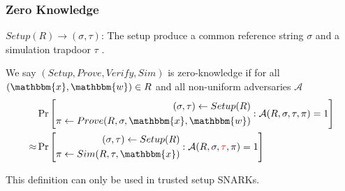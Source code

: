 \documentclass[UFT8]{beamer}
\begin{document}
\begin{frame}
    \frametitle{Zero Knowledge}
    \begin{definition}
        $Setup(R) \rightarrow (\sigma, \tau)$: The setup produce a common reference string $\sigma$ and a {\color{red}simulation trapdoor $\tau$ }.

        We say $(Setup, Prove, Verify, Sim)$ is zero-knowledge if for all $(\mathbbm{x}, \mathbbm{w}) \in R$ and all non-uniform adversaries $\mathcal{A}$
        \begin{align*}
            & \Pr\left[ \begin{aligned}
                (\sigma, \tau) \leftarrow Setup(R) \\
                \pi \leftarrow Prove(R, \sigma, \mathbbm{x}, \mathbbm{w})
            \end{aligned}: \mathcal{A}(R, \sigma, \tau, \pi) = 1 \right] \\
            \approx & \Pr\left[ \begin{aligned}
                (\sigma, \tau) \leftarrow Setup(R) \\
                \pi \leftarrow Sim(R, \tau, \mathbbm{x})
            \end{aligned}: \mathcal{A}(R, \sigma, {\color{red}\tau}, \pi) = 1 \right]
        \end{align*}
    \end{definition}
    This definition can only be used in trusted setup SNARKs.
\end{frame}
\end{document}

